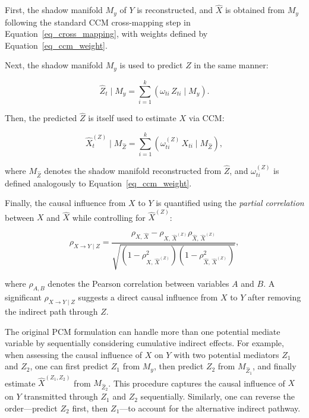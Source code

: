 \documentclass[authoryear,preprint,review,12pt]{elsarticle}
\begin{document}
First, the shadow manifold $M_y$ of $Y$ is reconstructed, and $\hat{X}$ is obtained from $M_y$ following the standard CCM cross-mapping step in Equation~\eqref{eq_cross_mapping}, with weights defined by Equation~\eqref{eq_ccm_weight}.  

Next, the shadow manifold $M_y$ is used to predict $Z$ in the same manner:

\begin{equation}\label{eq_pcm_zhat}
\hat{Z}_t \mid M_y = \sum_{i=1}^k \left( \omega_{ti} \, Z_{ti} \mid M_y \right).
\end{equation}

Then, the predicted $\hat{Z}$ is itself used to estimate $X$ via CCM:

\begin{equation}\label{eq_pcm_x_zhat}
\hat{X}^{(Z)}_t \mid M_{\hat{Z}} = \sum_{i=1}^k \left( \omega^{(Z)}_{ti} \, X_{ti} \mid M_{\hat{Z}} \right),
\end{equation}

\noindent where $M_{\hat{Z}}$ denotes the shadow manifold reconstructed from $\hat{Z}$, and $\omega^{(Z)}_{ti}$ is defined analogously to Equation~\eqref{eq_ccm_weight}.

Finally, the causal influence from $X$ to $Y$ is quantified using the \emph{partial correlation} between $X$ and $\hat{X}$ while controlling for $\hat{X}^{(Z)}$:

\begin{equation}\label{eq_pcm_partial_corr}
\rho_{X \to Y \mid Z} = \frac{ \rho_{X,\, \hat{X}} - \rho_{X,\, \hat{X}^{(Z)}} \rho_{\hat{X},\, \hat{X}^{(Z)}} }
{\sqrt{\left( 1 - \rho_{X,\, \hat{X}^{(Z)}}^2 \right) \left( 1 - \rho_{\hat{X},\, \hat{X}^{(Z)}}^2 \right) }},
\end{equation}

\noindent where $\rho_{A,B}$ denotes the Pearson correlation between variables $A$ and $B$. A significant $\rho_{X \to Y \mid Z}$ suggests a direct causal influence from $X$ to $Y$ after removing the indirect path through $Z$.

The original PCM formulation can handle more than one potential mediate variable by sequentially considering cumulative indirect effects. For example, when assessing the causal influence of $X$ on $Y$ with two potential mediators $Z_1$ and $Z_2$, one can first predict $Z_1$ from $M_y$, then predict $Z_2$ from $M_{\hat{Z}_1}$, and finally estimate $\hat{X}^{(Z_1,Z_2)}$ from $M_{\hat{Z}_2}$. This procedure captures the causal influence of $X$ on $Y$ transmitted through $Z_1$ and $Z_2$ sequentially. Similarly, one can reverse the order—predict $Z_2$ first, then $Z_1$—to account for the alternative indirect pathway.
\end{document}
